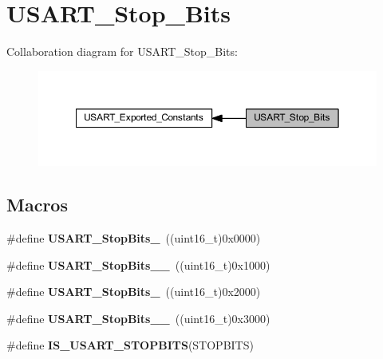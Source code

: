 \hypertarget{group___u_s_a_r_t___stop___bits}{}\section{U\+S\+A\+R\+T\+\_\+\+Stop\+\_\+\+Bits}
\label{group___u_s_a_r_t___stop___bits}
Collaboration diagram for U\+S\+A\+R\+T\+\_\+\+Stop\+\_\+\+Bits\+:
\nopagebreak
\begin{figure}[H]
\begin{center}
\leavevmode
\includegraphics[width=350pt]{group___u_s_a_r_t___stop___bits}
\end{center}
\end{figure}
\subsection*{Macros}
\begin{DoxyCompactItemize}
\item 
\mbox{\label{group___u_s_a_r_t___stop___bits_gae2cb35620ba001f0d63e9e0be93e4a05}} 
\#define {\bfseries U\+S\+A\+R\+T\+\_\+\+Stop\+Bits\+\_}~((uint16\+\_\+t)0x0000)
\item 
\mbox{\label{group___u_s_a_r_t___stop___bits_ga2ad06e3acfb691735d05ab9a314e2e32}} 
\#define {\bfseries U\+S\+A\+R\+T\+\_\+\+Stop\+Bits\+\_\+\_}~((uint16\+\_\+t)0x1000)
\item 
\mbox{\label{group___u_s_a_r_t___stop___bits_ga652058b6be2f48ac0d82d0e75537fc81}} 
\#define {\bfseries U\+S\+A\+R\+T\+\_\+\+Stop\+Bits\+\_}~((uint16\+\_\+t)0x2000)
\item 
\mbox{\label{group___u_s_a_r_t___stop___bits_ga30897cc46d5b3790a9b14ffaba354527}} 
\#define {\bfseries U\+S\+A\+R\+T\+\_\+\+Stop\+Bits\+\_\+\_}~((uint16\+\_\+t)0x3000)
\item 
\#define {\bfseries I\+S\+\_\+\+U\+S\+A\+R\+T\+\_\+\+S\+T\+O\+P\+B\+I\+TS}(S\+T\+O\+P\+B\+I\+TS)
\end{DoxyCompactItemize}



